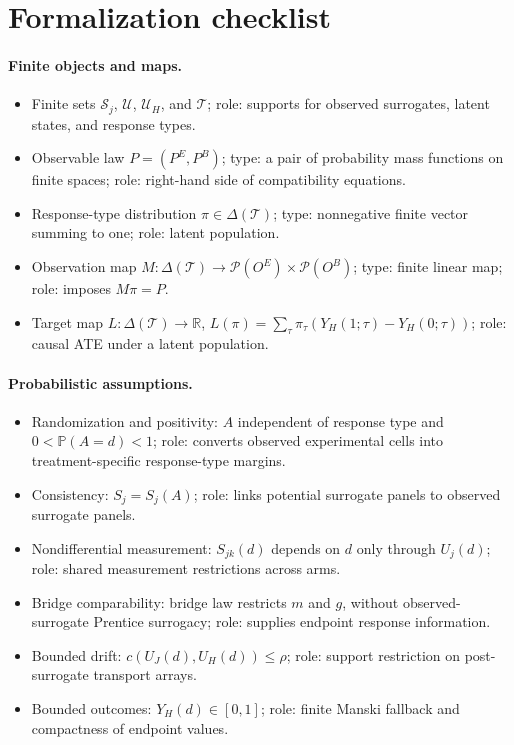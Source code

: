\documentclass[11pt]{article}
\renewcommand{\Pr}{\mathbb{P}}
\newcommand{\R}{\mathbb{R}}
\theoremstyle{definition}
\theoremstyle{plain}
\theoremstyle{remark}
\begin{document}
\section{Formalization checklist}
\paragraph{Finite objects and maps.}
\begin{itemize}[leftmargin=*]
  \item Finite sets \(\mathcal S_j\), \(\mathcal U\), \(\mathcal U_H\), and \(\mathcal T\); role: supports for observed surrogates, latent states, and response types.
  \item Observable law \(P=(P^E,P^B)\); type: a pair of probability mass functions on finite spaces; role: right-hand side of compatibility equations.
  \item Response-type distribution \(\pi\in\Delta(\mathcal T)\); type: nonnegative finite vector summing to one; role: latent population.
  \item Observation map \(M:\Delta(\mathcal T)\to\mathcal P(O^E)\times\mathcal P(O^B)\); type: finite linear map; role: imposes \(M\pi=P\).
  \item Target map \(L:\Delta(\mathcal T)\to\R\), \(L(\pi)=\sum_\tau \pi_\tau(Y_H(1;\tau)-Y_H(0;\tau))\); role: causal ATE under a latent population.
\end{itemize}

\paragraph{Probabilistic assumptions.}
\begin{itemize}[leftmargin=*]
  \item Randomization and positivity: \(A\) independent of response type and \(0<\Pr(A=d)<1\); role: converts observed experimental cells into treatment-specific response-type margins.
  \item Consistency: \(S_j=S_j(A)\); role: links potential surrogate panels to observed surrogate panels.
  \item Nondifferential measurement: \(S_{jk}(d)\) depends on \(d\) only through \(U_j(d)\); role: shared measurement restrictions across arms.
  \item Bridge comparability: bridge law restricts \(m\) and \(g\), without observed-surrogate Prentice surrogacy; role: supplies endpoint response information.
  \item Bounded drift: \(c(U_J(d),U_H(d))\le\rho\); role: support restriction on post-surrogate transport arrays.
  \item Bounded outcomes: \(Y_H(d)\in[0,1]\); role: finite Manski fallback and compactness of endpoint values.
\end{itemize}
\end{document}
